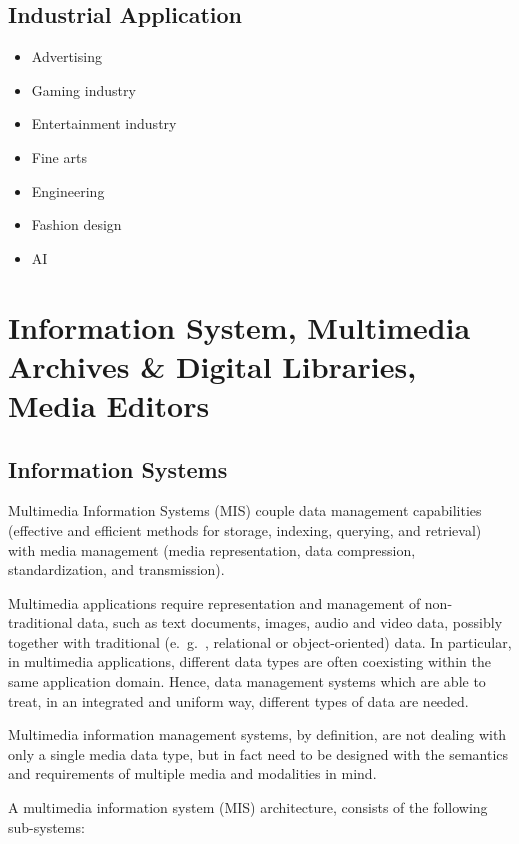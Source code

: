 \subsection{Industrial Application}
	\begin{itemize}
		\item Advertising
		\item Gaming industry
		\item Entertainment industry
		\item Fine arts
		\item Engineering
		\item Fashion design
		\item AI
	\end{itemize}



{\raggedright \section{Information System, Multimedia Archives \& Digital Libraries, Media Editors}\par}
 
 \subsection{Information Systems}
 Multimedia Information Systems (MIS) couple data management capabilities (effective and efficient methods for storage, indexing, querying, and retrieval) with media management (media representation, data compression, standardization, and transmission).
 
 Multimedia applications require representation and management of non-traditional data, such as text documents, images, audio and video data, possibly together with traditional (e.\ g.\ , relational or object-oriented) data. In particular, in multimedia applications, different data types are often coexisting within the same application domain. Hence, data management systems which are able to treat, in an integrated and uniform way, different types of data are needed.
 
 Multimedia information management systems, by definition, are not dealing with only a single media data type, but in fact need to be designed with the semantics and requirements of multiple media and modalities in mind. 
 
 A multimedia information system (MIS) architecture, consists of the following sub-systems: 
 
